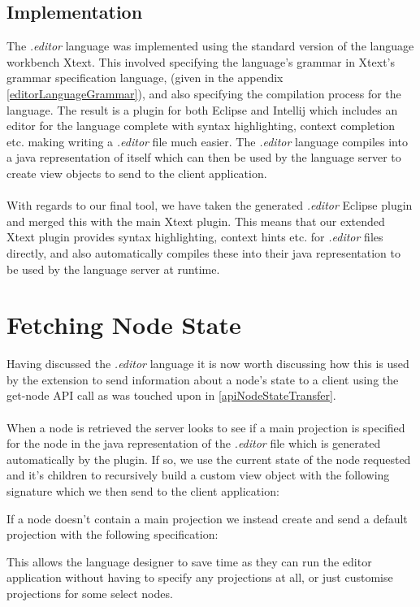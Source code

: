 \documentclass{article}
\begin{document}
\subsection{Implementation}
The \emph{.editor} language was implemented using the standard version of the language workbench Xtext. This involved specifying the language's grammar in Xtext's grammar specification language, (given in the appendix \ref{editorLanguageGrammar}), and also specifying the compilation process for the language. The result is a plugin for both Eclipse and Intellij which includes an editor for the language complete with syntax highlighting, context completion etc. making writing a \emph{.editor} file much easier. The \emph{.editor} language compiles into a java representation of itself which can then be used by the language server to create view objects to send to the client application.
\\
\\
With regards to our final tool, we have taken the generated \emph{.editor} Eclipse plugin and merged this with the main Xtext plugin. This means that our extended Xtext plugin provides syntax highlighting, context hints etc. for \emph{.editor} files directly, and also automatically compiles these into their java representation to be used by the language server at runtime.

\section{Fetching Node State}\label{viewObject}

Having discussed the \emph{.editor} language it is now worth discussing how this is used by the extension to send information about a node's state to a client using the get-node API call as was touched upon in \ref{apiNodeStateTransfer}. 
\\
\\
When a node is retrieved the server looks to see if a main projection is specified for the node in the java representation of the \emph{.editor} file which is generated automatically by the plugin. If so, we use the current state of the node requested and it's children to recursively build a custom view object with the following signature which we then send to the client application:

If a node doesn't contain a main projection we instead create and send a default projection with the following specification: 

This allows the language designer to save time as they can run the editor application without having to specify any projections at all, or just customise projections for some select nodes. 
\end{document}
